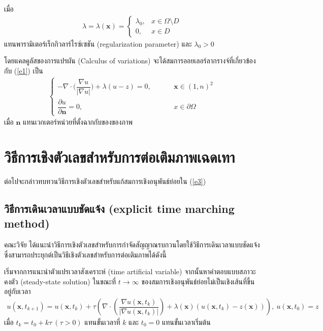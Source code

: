 เมื่อ 
\begin{align}
    \lambda=\lambda(\mathbf{x}) = \left \{ \begin{array}{ll}  \lambda_0, & x \in \Omega \setminus D \\ 0, & x \in D  \end{array} \right . 
    \label{e2}
\end{align}
แทนพารามิเตอร์เร็กกิวลาร์ไรซ์เซชัน (regularization parameter) และ $\lambda_0 >0$

\hspace{1cm} โดยแคลคูลัสของการแปรผัน (Calculus of variations) จะได้สมการออยเลอร์ลากรางจ์ที่เกี่ยวข้องกับ (\ref{e1}) เป็น 
\begin{align}
    \left \{ \begin{array}{ll}  - \nabla \cdot  \Big( \dfrac{\nabla u}{|\nabla u|} \Big) + \lambda (u-z) = 0,  & \hspace{1cm} \mathbf{x} \in (1,n)^2 \\ \dfrac{\partial u}{\partial \boldsymbol{n}} = 0, & \hspace{1cm} x \in \partial \Omega \end{array} \right . 
    \label{e3}
\end{align}
เมื่อ $\boldsymbol{n}$ แทนเวกเตอร์หน่วยที่ตั้งฉากกับของของภาพ

\section{วิธีการเชิงตัวเลขสำหรับการต่อเติมภาพเฉดเทา}
\hspace{1cm} ต่อไปจะกล่าวทบทวนวิธีการเชิงตัวเลขสำหรับแก้สมการเชิงอนุพันธ์ย่อยใน (\ref{e3}) 

\subsection{วิธีการเดินเวลาแบบชัดแจ้ง (explicit time marching method) }

\hspace{1cm} คณะวิจัย \cite{ref:ROF-template} ได้แนะนำวิธีการเชิงตัวเลขสำหรับการกำจัดสัญญาณรบกวนโดยใช้วิธีการเดินเวลาแบบชัดแจ้ง ซึ่งสามารถประยุกต์เป็นวิธีเชิงตัวเลขสำหรับการต่อเติมภาพได้ดังนี้
	
\hspace{1cm} เริ่มจากการแนะนําตัวแปรเวลาสังเคราะห์ (time artificial variable) จากนั้นหาคําตอบแบบสภาวะคงตัว (steady-state solution) ในขณะที่ $t\rightarrow \infty$ ของสมการเชิงอนุพันธ์ย่อยไม่เป็นเชิงเส้นที่ขึ้นอยู่กับเวลา 
\begin{align}
	u(\mathbf{x},t_{k+1})=u(\mathbf{x},t_{k})+\tau\left(\nabla \cdot\left(\dfrac{\nabla u (\mathbf{x},t_k)}{| \nabla u (\mathbf{x},t_k) | }\right) + \lambda(\mathbf{x})(u (\mathbf{x},t_k)-z(\mathbf{x})) \right),\ u(\mathbf{x},t_0)=z
	\label{e4}
\end{align}
เมื่อ $t_k=t_0+k\tau\ (\tau>0)$  แทนขั้นเวลาที่ $k$ และ $t_0=0$ แทนขั้นเวลาเริ่มต้น
	
